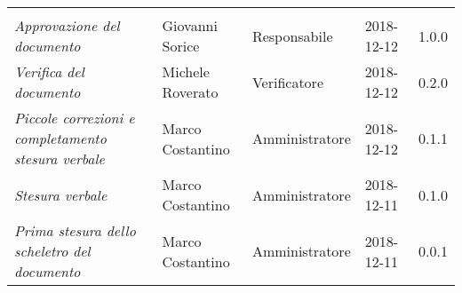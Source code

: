 \newpage 
\section*{}
\begin{table}[H]
	\centering
	\begin{tabular}{p{4cm}|C{3cm}|C{3cm}|R{2.5cm}|R{2cm}}
		
		 & & & & \\
		
		
		\emph{Approvazione del documento} & Giovanni Sorice & Responsabile & 2018-12-12 & 1.0.0 \\
		\hline
		
		\emph{Verifica del documento} & Michele Roverato & Verificatore & 2018-12-12 & 0.2.0 \\
		\hline

		\emph{Piccole correzioni e completamento stesura verbale} & Marco Costantino & Amministratore & 2018-12-12 & 0.1.1 \\
		\hline

		\emph{Stesura verbale} & Marco Costantino & Amministratore & 2018-12-11 & 0.1.0 \\
		\hline
		
		\emph{Prima stesura dello scheletro del documento} & Marco Costantino & Amministratore & 2018-12-11 & 0.0.1 \\
		
	\end{tabular}
	
\end{table}


\clearpage
